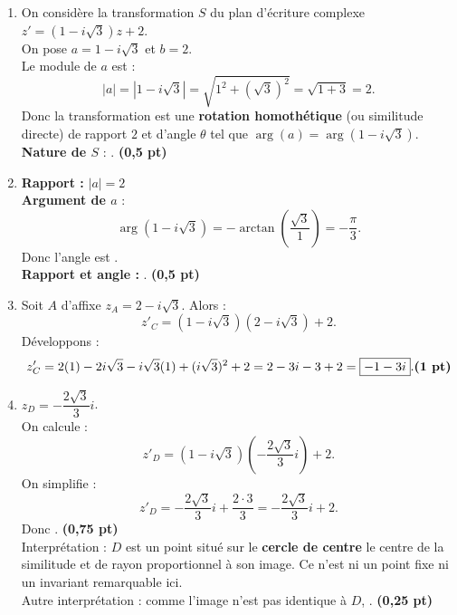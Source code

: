 \documentclass[12pt,a4paper]{article}
\begin{document}
\begin{enumerate}
    \item On considère la transformation \( S \) du plan d’écriture complexe \( z' = (1 - i\sqrt{3})z + 2 \).\\
          On pose \( a = 1 - i\sqrt{3} \) et \( b = 2 \).\\
          Le module de \( a \) est :
          \[
              |a| = |1 - i\sqrt{3}| = \sqrt{1^2 + (\sqrt{3})^2} = \sqrt{1 + 3} = 2.
          \]
          Donc la transformation est une \textbf{rotation homothétique} (ou similitude directe) de rapport \( 2 \) et d’angle \( \theta \) tel que \( \arg(a) = \arg(1 - i\sqrt{3}) \).\\
          \textbf{Nature de \( S \)} : . \hfill \textbf{(0,5 pt)}

    \item \textbf{Rapport :} \( |a| = 2 \)\\
          \textbf{Argument de \( a \)} :
          \[
              \arg(1 - i\sqrt{3}) = -\arctan\left( \dfrac{\sqrt{3}}{1} \right) = -\dfrac{\pi}{3}.
          \]
          Donc l’angle est .\\
          \textbf{Rapport et angle :} . \hfill \textbf{(0,5 pt)}

    \item Soit \( A \) d’affixe \( z_A = 2 - i\sqrt{3} \). Alors :
          \[
              z'_C = (1 - i\sqrt{3})(2 - i\sqrt{3}) + 2.
          \]
          Développons :
          \[
              z'_C = 2(1) - 2i\sqrt{3} - i\sqrt{3}(1) + (i\sqrt{3})^2 + 2 = 2 - 3i - 3 + 2 = \boxed{-1 - 3i}. \hfill \textbf{(1 pt)}
          \]

    \item \( z_D = -\dfrac{2\sqrt{3}}{3}i \).\\
          On calcule :
          \[
              z'_D = (1 - i\sqrt{3}) \left(-\dfrac{2\sqrt{3}}{3}i \right) + 2.
          \]
          On simplifie :
          \[
              z'_D = -\dfrac{2\sqrt{3}}{3}i + \dfrac{2\cdot 3}{3} = -\dfrac{2\sqrt{3}}{3}i + 2.
          \]
          Donc . \hfill \textbf{(0,75 pt)}\\
          Interprétation : \( D \) est un point situé sur le \textbf{cercle de centre} le centre de la similitude et de rayon proportionnel à son image. Ce n’est ni un point fixe ni un invariant remarquable ici.\\
          Autre interprétation : comme l’image n’est pas identique à \( D \), . \hfill \textbf{(0,25 pt)}
\end{enumerate}
\end{document}
